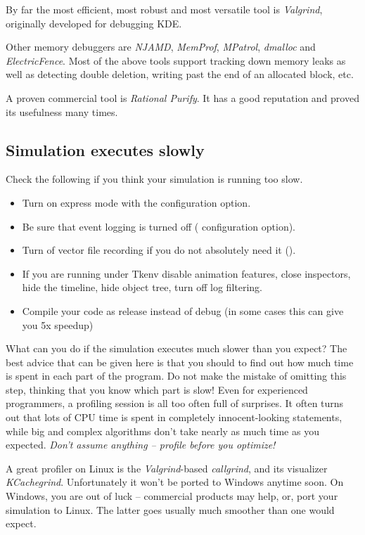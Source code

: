By far the most efficient, most robust and most versatile tool
is \textit{Valgrind}, originally developed for debugging KDE.

Other memory debuggers are \textit{NJAMD}, \textit{MemProf},
\textit{MPatrol}, \textit{dmalloc} and \textit{ElectricFence}.
Most of the above tools support tracking down memory leaks as well as
detecting double deletion, writing past the end of an allocated block, etc.

A proven commercial tool is \textit{Rational Purify}. It has
a good reputation and proved its usefulness many times.

\subsection{Simulation executes slowly}

Check the following if you think your simulation is running too slow.

\begin{itemize}
  \item Turn on express mode with the  configuration option.
  \item Be sure that event logging is turned off ( configuration option).
  \item Turn of vector file recording if you do not absolutely need it ().
  \item If you are running under Tkenv disable animation features, close inspectors,
        hide the timeline, hide object tree, turn off log filtering.
  \item Compile your code as release instead of debug (in some cases this can give you 5x speedup)
\end{itemize}


What can you do if the simulation executes much slower than you expect?
The best advice that can be given here is that you should
 to find out how much time is spent in each
part of the program. Do not make the mistake of omitting this step,
thinking that you know which part is slow! Even for experienced
programmers, a profiling session is all too often full of surprises.
It often turns out that lots of CPU time is spent in completely
innocent-looking statements, while big and complex algorithms
don't take nearly as much time as you expected. \textit{Don't assume anything
-- profile before you optimize!}

A great profiler on Linux is the \textit{Valgrind}-based
\textit{callgrind}, and its visualizer \textit{KCachegrind}.
Unfortunately it won't be ported to Windows anytime soon.
On Windows, you are out of luck -- commercial products may help, or,
port your simulation to Linux. The latter goes usually much smoother
than one would expect.


